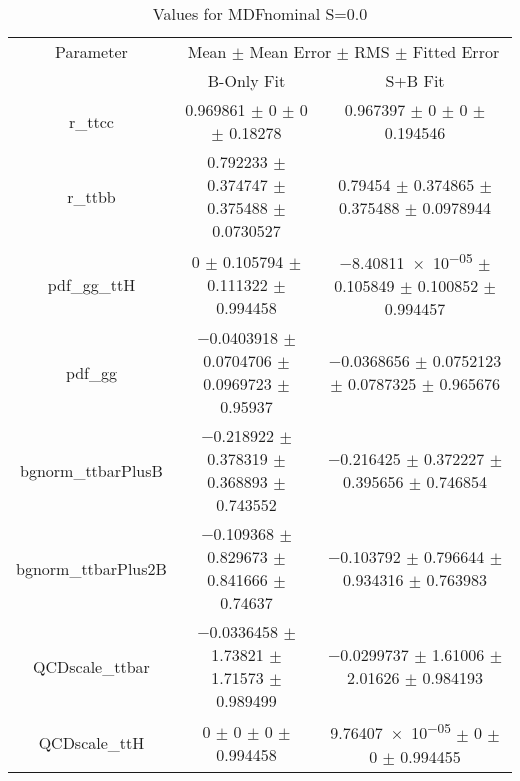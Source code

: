 \begin{table}
\centering
\caption{Values for MDFnominal S=0.0}
\begin{tabular}{ccc}
\toprule
Parameter & \multicolumn{2}{c}{Mean $\pm$ Mean Error $\pm$ RMS $\pm$ Fitted Error}\\
 & B-Only Fit & S+B Fit\\
\midrule
r\_ttcc & \num{0.969861} $\pm$ \num{0} $\pm$ \num{0} $\pm$ \num{0.18278} & \num{0.967397} $\pm$ \num{0} $\pm$ \num{0} $\pm$ \num{0.194546}\\
r\_ttbb & \num{0.792233} $\pm$ \num{0.374747} $\pm$ \num{0.375488} $\pm$ \num{0.0730527} & \num{0.79454} $\pm$ \num{0.374865} $\pm$ \num{0.375488} $\pm$ \num{0.0978944}\\
pdf\_gg\_ttH & \num{0} $\pm$ \num{0.105794} $\pm$ \num{0.111322} $\pm$ \num{0.994458} & \num{-8.40811e-05} $\pm$ \num{0.105849} $\pm$ \num{0.100852} $\pm$ \num{0.994457}\\
pdf\_gg & \num{-0.0403918} $\pm$ \num{0.0704706} $\pm$ \num{0.0969723} $\pm$ \num{0.95937} & \num{-0.0368656} $\pm$ \num{0.0752123} $\pm$ \num{0.0787325} $\pm$ \num{0.965676}\\
bgnorm\_ttbarPlusB & \num{-0.218922} $\pm$ \num{0.378319} $\pm$ \num{0.368893} $\pm$ \num{0.743552} & \num{-0.216425} $\pm$ \num{0.372227} $\pm$ \num{0.395656} $\pm$ \num{0.746854}\\
bgnorm\_ttbarPlus2B & \num{-0.109368} $\pm$ \num{0.829673} $\pm$ \num{0.841666} $\pm$ \num{0.74637} & \num{-0.103792} $\pm$ \num{0.796644} $\pm$ \num{0.934316} $\pm$ \num{0.763983}\\
QCDscale\_ttbar & \num{-0.0336458} $\pm$ \num{1.73821} $\pm$ \num{1.71573} $\pm$ \num{0.989499} & \num{-0.0299737} $\pm$ \num{1.61006} $\pm$ \num{2.01626} $\pm$ \num{0.984193}\\
QCDscale\_ttH & \num{0} $\pm$ \num{0} $\pm$ \num{0} $\pm$ \num{0.994458} & \num{9.76407e-05} $\pm$ \num{0} $\pm$ \num{0} $\pm$ \num{0.994455}\\
\bottomrule
\end{tabular}
\end{table}